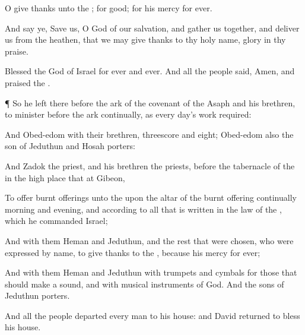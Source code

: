 {O give
thanks unto the
{}; for
{}
good; for his
mercy
{} for
ever.

And
say ye,
Save us, O
God of our
salvation, and gather us
together, and
deliver us from the
heathen, that we may give
thanks to thy
holy
name,
{}
glory in thy
praise.

Blessed
{} the
{}
God of
Israel for
ever and
ever. And all the
people
said,
Amen, and
praised the
{}.


\par }{\PP {}¶ So he
left there
before the
ark of the
covenant of the
{}
Asaph and his
brethren, to
minister
before the
ark
continually, as every
day’s
work
required:

And
Obed-edom with their
brethren,
threescore and
eight;
Obed-edom also the
son of
Jeduthun and
Hosah
{}
porters:

And
Zadok the
priest, and his
brethren the
priests,
before the
tabernacle of the
{} in the high
place that
{} at
Gibeon,

To
offer burnt
offerings unto the
{} upon the
altar of the burnt
offering
continually
morning and
evening, and
{} according to all that is
written in the
law of the
{}, which he
commanded
Israel;

And with them
Heman and
Jeduthun, and the
rest that were
chosen, who were
expressed by
name, to give
thanks to the
{}, because his
mercy
{} for
ever;

And with them
Heman and
Jeduthun with
trumpets and
cymbals for those that should make a
sound, and with
musical
instruments of
God. And the
sons of
Jeduthun
{}
porters.

And all the
people
departed every
man to his
house: and
David
returned to
bless his
house.




\par }
